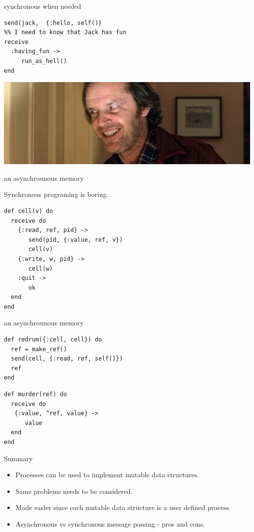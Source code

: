 \begin{frame}[fragile]{synchronous when needed}
\begin{verbatim}
send(jack,  {:hello, self()}
%% I need to know that Jack has fun
receive 
  :having_fun ->
     run_as_hell()
end
\end{verbatim}
\pause
\includegraphics[height=0.3\textheight]{fun.jpg}
\end{frame}

\begin{frame}[fragile]{an asynchrounous memory}

Synchronous programing is boring.

\begin{verbatim}
def cell(v) do
  receive do
    {:read, ref, pid} ->
       send(pid, {:value, ref, v})
       cell(v)
    {:write, w, pid} ->
       cell(w)
    :quit ->
       ok
  end
end
\end{verbatim}

  
\end{frame}

\begin{frame}[fragile]{an asynchrounous memory}

\begin{verbatim}
def redrum({:cell, cell}) do
  ref = make_ref()
  send(cell, {:read, ref, self()})
  ref
end
\end{verbatim} \pause

\begin{verbatim}  
def murder(ref) do
  receive do
   {:value, ^ref, value} -> 
      value
  end
end
\end{verbatim}


\end{frame}


\begin{frame}{Summary}

\begin{itemize}
\item Processes can be used to implement mutable data structures.
\item Same problems needs to be considered. 
\item Made easier since each mutable data structure is a user defined process.
\item Asynchronous vs synchronous message passing - pros and cons.
\end{itemize}

\end{frame}

